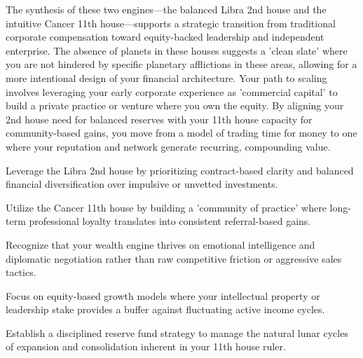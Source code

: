 {\fontsize{9}{13}\selectfont The synthesis of these two engines---the balanced Libra 2nd house and the intuitive Cancer 11th house---supports a strategic transition from traditional corporate compensation toward equity-backed leadership and independent enterprise. The absence of planets in these houses suggests a 'clean slate' where you are not hindered by specific planetary afflictions in these areas, allowing for a more intentional design of your financial architecture. Your path to scaling involves leveraging your early corporate experience as 'commercial capital' to build a private practice or venture where you own the equity. By aligning your 2nd house need for balanced reserves with your 11th house capacity for community-based gains, you move from a model of trading time for money to one where your reputation and network generate recurring, compounding value.}\par\vspace{1.8mm}

\begin{diamondlist}
  \item {\fontsize{8.5}{12}\selectfont Leverage the Libra 2nd house by prioritizing contract-based clarity and balanced financial diversification over impulsive or unvetted investments.}
  \item {\fontsize{8.5}{12}\selectfont Utilize the Cancer 11th house by building a 'community of practice' where long-term professional loyalty translates into consistent referral-based gains.}
  \item {\fontsize{8.5}{12}\selectfont Recognize that your wealth engine thrives on emotional intelligence and diplomatic negotiation rather than raw competitive friction or aggressive sales tactics.}
  \item {\fontsize{8.5}{12}\selectfont Focus on equity-based growth models where your intellectual property or leadership stake provides a buffer against fluctuating active income cycles.}
  \item {\fontsize{8.5}{12}\selectfont Establish a disciplined reserve fund strategy to manage the natural lunar cycles of expansion and consolidation inherent in your 11th house ruler.}
\end{diamondlist}


\label{topic53}

